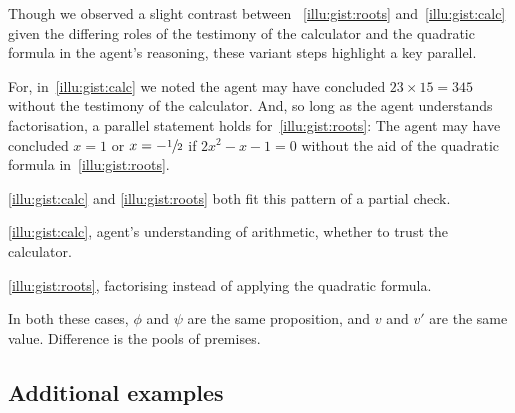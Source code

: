 \begin{note}
  \color{red}
  Though we observed a slight contrast between ~\ref{illu:gist:roots} and~\ref{illu:gist:calc} given the differing roles of the testimony of the calculator and the quadratic formula in the agent's reasoning, these variant steps highlight a key parallel.

  For, in~\autoref{illu:gist:calc} we noted the agent may have concluded \(23 \times 15 = 345\) without the testimony of the calculator.
  And, so long as the agent understands factorisation, a parallel statement holds for~\ref{illu:gist:roots}:
  The agent may have concluded \(x = 1\) or \(x = -\sfrac{1}{2}\) if \(2x^{2} - x - 1 = 0\) without the aid of the quadratic formula in~\autoref{illu:gist:roots}.
\end{note}

\begin{note}
   \ref{illu:gist:calc} and \ref{illu:gist:roots} both fit this pattern of a partial check.

  \autoref{illu:gist:calc}, agent's understanding of arithmetic, whether to trust the calculator.

  \autoref{illu:gist:roots}, factorising instead of applying the quadratic formula.

  In both these cases, \(\phi\) and \(\psi\) are the same proposition, and \(v\) and \(v'\) are the same value.
  Difference is the pools of premises.
\end{note}

\subsection{Additional examples}

\subsubsection{}

